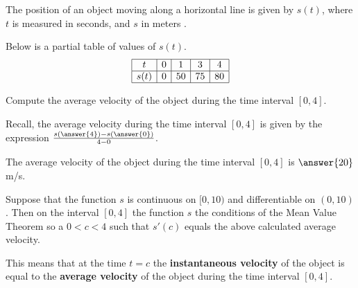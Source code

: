 \documentclass{ximera}
\author{Nela Lakos \and Kyle Parsons}
\begin{document}
The position of an object moving along a horizontal line is given by $s(t)$, where $t$ is measured in seconds, and $s$ in meters .

Below is a partial table of values of $s(t)$.
\[
\begin{array}{|c|c|c|c|c|}
\hline
t & 0 & 1 & 3 & 4\\\hline
s(t) & 0 & 50 & 75 & 80\\\hline
\end{array} 
\]
\begin{exercise}
Compute the average velocity of the object during the time interval $[0,4]$.
\begin{hint}
Recall, the average velocity during the time interval $[0,4]$ is given by the expression $\frac{s(\answer{4})-s(\answer{0})}{4-0}$.
\end{hint}
The average velocity of the object during the time interval $[0,4]$ is $\answer{20}$ m/s.
\end{exercise}
\begin{exercise}
Suppose that the function $s$ is continuous on $[0,10)$ and differentiable on $(0,10)$. Then  on the interval $[0,4]$ the function $s$  the conditions of the Mean Value Theorem so  a $0<c<4$ such that $s'(c)$ equals the above calculated average velocity.

This means that at the time $t=c$ the \textbf{instantaneous velocity} of the object is equal to the \textbf{average velocity} of the object during the time interval $[0,4]$.
\end{exercise}
\end{document}
